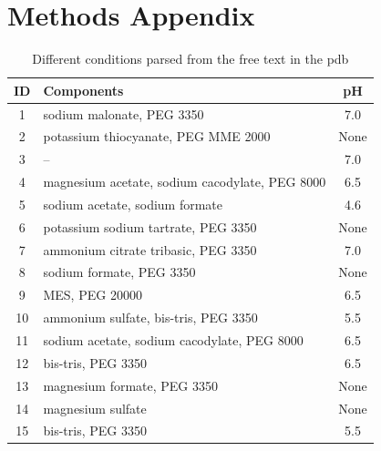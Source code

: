 
\chapter{Methods Appendix}\label{app:methods} %

\begin{table}[h]
	\centering
	\renewcommand{\arraystretch}{0.8} %
	\begin{tabular}{c|l|c}
		\textbf{ID} & \textbf{Components} & \textbf{pH} \\ \hline
		1  & sodium malonate, PEG 3350 & 7.0 \\
		2  & potassium thiocyanate, PEG MME 2000 & None \\
		3  & -- & 7.0 \\
		4  & magnesium acetate, sodium cacodylate, PEG 8000 & 6.5 \\
		5  & sodium acetate, sodium formate & 4.6 \\
		6  & potassium sodium tartrate, PEG 3350 & None \\
		7  & ammonium citrate tribasic, PEG 3350 & 7.0 \\
		8  & sodium formate, PEG 3350 & None \\
		9  & MES, PEG 20000 & 6.5 \\
		10 & ammonium sulfate, bis-tris, PEG 3350 & 5.5 \\
		11 & sodium acetate, sodium cacodylate, PEG 8000 & 6.5 \\
		12 & bis-tris, PEG 3350 & 6.5 \\
		13 & magnesium formate, PEG 3350 & None \\
		14 & magnesium sulfate & None \\
		15 & bis-tris, PEG 3350 & 5.5 \\
	\end{tabular}
	\caption[Condition Examples]{Different conditions parsed from the free text in the \gls{pdb}}
	\label{tab:conditionExamples}
\end{table}

